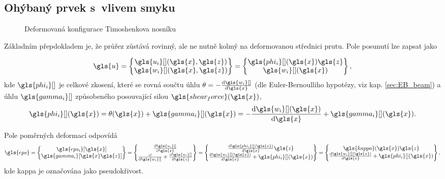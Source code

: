 \subsection{Ohýbaný prvek s~vlivem smyku} \label{sec:TIM_beam}

\begin{figure}[H]
    
    \caption{Deformovaná konfigurace Timoshenkova nosníku}
    \label{fig:tim_deformed_beam}
\end{figure}

Základním přepdokladem je, že průřez zůstává rovinný, ale ne nutně kolmý na deformovanou střednici prutu. Pole posunutí lze zapsat jako

\begin{equation}
    \gls{u} 
    = 
    \begin{Bmatrix}
        \gls{u_i}[ ](\gls{x}, \gls{z}) \\
        \gls{w_i}[ ](\gls{x}, \gls{z})
    \end{Bmatrix}
    =
    \begin{Bmatrix}
        \gls{phi_i}[ ](\gls{x}) \gls{z}\\
        \gls{w_i}[ ](\gls{x})
    \end{Bmatrix},
\end{equation}
kde $\gls{phi_i}[ ]$ je celkové zkosení, které se rovná součtu úhlu $\theta = -\dv{\gls{w_i}[ ]}{\gls{x}}$ (dle Euler-Bernoulliho hypotézy, viz kap. \ref{sec:EB_beam}) a úhlu $\gls{gamma_i}[ ]$ způsobeného posouvající silou $\gls{shear_force}(\gls{x})$,
\begin{equation}
    \label{eq:tim_phi}
    \gls{phi_i}[ ](\gls{x}) = \theta(\gls{x}) + \gls{gamma_i}[ ](\gls{x}) = -\dv{\gls{w_i}[ ](\gls{x})}{\gls{x}} + \gls{gamma_i}[ ](\gls{x}).
\end{equation}

Pole poměrných deformací odpovídá
\begin{equation}
    \gls{eps}
    =
    \begin{Bmatrix}
        \gls{eps_i}[\gls{x}] \\
        \gls{gamma_i}[\gls{x}\gls{z}]
    \end{Bmatrix}
    =
    \begin{Bmatrix}
        \pdv{\gls{u_i}[ ]}{\gls{x}} \\
        \pdv{\gls{w_i}[ ]} + \pdv{\gls{u_i}[ ]}{\gls{z}}
    \end{Bmatrix}
    =
    \begin{Bmatrix}
        \dv{\gls{phi_i}[ ](\gls{x})}{\gls{x}} \gls{z} \\
        \dv{\gls{w_i}[ ](\gls{x})}{\gls{x}} + \gls{phi_i}[ ](\gls{x})
    \end{Bmatrix}
    =
    \begin{Bmatrix}
        \gls{kappa}(\gls{x}) \gls{z}\\
        \dv{\gls{w_i}[ ](\gls{x})}{\gls{x}} + \gls{phi_i}[ ](\gls{x})
    \end{Bmatrix}
    ,
\end{equation}
kde \gls{kappa} je označována jako pseudokřivost.

